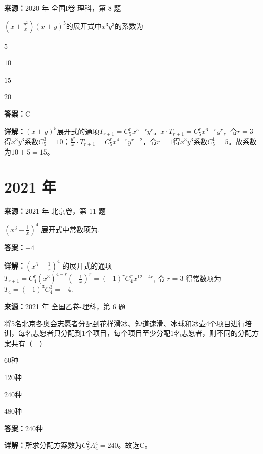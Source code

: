 \begin{question}[points=5]
\textbf{来源：}2020 年 全国I卷-理科，第 8 题\par
$\left(x+\frac{y^2}{x}\right)(x+y)^5$的展开式中$x^3y^3$的系数为
\begin{choices}
  \item $5$
  \item $10$
  \item $15$
  \item $20$
\end{choices}
\begin{solution}
\textbf{答案：}C

\textbf{详解：}$(x+y)^5$展开式的通项$T_{r+1}=C_5^r x^{5-r}y^r$。$x\cdot T_{r+1}=C_5^r x^{6-r}y^r$，令$r=3$得$x^3y^3$系数$C_5^3=10$；$\frac{y^2}{x}\cdot T_{r+1}=C_5^r x^{4-r}y^{r+2}$，令$r=1$得$x^3y^3$系数$C_5^1=5$。故系数为$10+5=15$。
\end{solution}
\end{question}

\section*{2021 年}

\begin{question}[points=5]
\textbf{来源：}2021 年 北京卷，第 11 题\par
$(x^3-\frac{1}{x})^4$ 展开式中常数项为.
\fillin[{$-4$}]
\begin{solution}
\textbf{答案：}$-4$

\textbf{详解：}$(x^3-\frac{1}{x})^4$ 的展开式的通项 $T_{r+1}=C_4^r (x^3)^{4-r}(-\frac{1}{x})^r=(-1)^r C_4^r x^{12-4r}$, 令 $r=3$ 得常数项为 $T_4=(-1)^3 C_4^3=-4$.
\end{solution}
\end{question}

\begin{question}[points=5]
\textbf{来源：}2021 年 全国乙卷-理科，第 6 题\par
将5名北京冬奥会志愿者分配到花样滑冰、短道速滑、冰球和冰壶4个项目进行培训，每名志愿者只分配到1个项目，每个项目至少分配1名志愿者，则不同的分配方案共有（  ）
\begin{choices}
  \item 60种
  \item 120种
  \item 240种
  \item 480种
\end{choices}
\begin{solution}
\textbf{答案：}240种

\textbf{详解：}所求分配方案数为$C_5^2 A_4^4=240$。故选C。
\end{solution}
\end{question}

